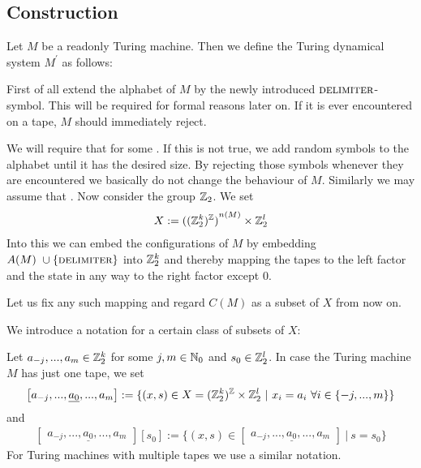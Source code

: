 \subsection{Construction}
\label{tm_to_tds:construction}

Let $M$ be a readonly Turing machine.
Then we define the Turing dynamical system $M^\prime$ as follows:

First of all extend the alphabet of $M$ by the newly introduced $\text{\scshape{delimiter}}$-symbol. This will be required for formal reasons later on. If it is ever encountered on a tape, $M$ should immediately reject.

We will require that  for some .
If this is not true, we add random symbols to the alphabet until it has the desired size. By rejecting those symbols whenever they are encountered we basically do not change the behaviour of $M$.
Similarly we may assume that .
Now consider the group $\mathbb{Z}_2$.
We set
\begin{align*}
	X := {{((\mathbb{Z}_2^{k})^{\mathbb{Z}})}^{n(M)}} \times \mathbb{Z}_2^l
\end{align*}
Into this we can embed the configurations of $M$ by embedding $A(M)~\cup\{\text{\scshape{delimiter}}\}$ into $\mathbb{Z}_2^k$ and thereby mapping the tapes to the left factor and the state in any way to the right factor except $0$.

Let us fix any such mapping and regard $C(M)$ as a subset of $X$ from now on.

\begin{Notation}
	We introduce a notation for a certain class of subsets of $X$:
	
	Let $a_{-j},...,a_{m} \in \mathbb{Z}_2^k$ for some $j, m \in \mathbb{N}_0$ and $s_0 \in \mathbb{Z}_2^l$. In case the Turing machine $M$ has just one tape, we set
	\begin{align*}
		\begin{bmatrix}
			a_{-j},...,\underline{a_0},...,a_m
		\end{bmatrix} := \{ (x,s) \in X = (\mathbb{Z}_2^k)^{\mathbb{Z}} \times \mathbb{Z}_2^l ~|~ x_i = a_i ~\forall i \in \{-j,...,m\}\} 
	\end{align*}
	and
	\begin{align*}
		\begin{bmatrix}
			a_{-j},...,\underline{a_0},...,a_m
		\end{bmatrix} [ s_0 ] := \{ (x,s) \in \begin{bmatrix} a_{-j},...,\underline{a_0},...,a_m \end{bmatrix} ~|~ s = s_0 \}
	\end{align*}
	For Turing machines with multiple tapes we use a similar notation.
\end{Notation}

